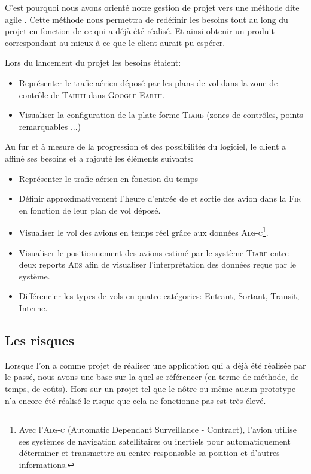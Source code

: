 C'est pourquoi nous avons orienté notre gestion de projet vers une méthode dite agile . Cette méthode nous permettra de redéfinir les besoins tout au long du projet en fonction de ce qui a déjà été réalisé. Et ainsi obtenir un produit correspondant au mieux à ce que le client aurait pu espérer.

Lors du lancement du projet les besoins étaient:
\begin{itemize}
    \item Représenter le trafic aérien déposé par les plans de vol dans la zone de contrôle de \textsc{Tahiti} dans \textsc{Google Earth}.
    \item Visualiser la configuration de la plate-forme \textsc{Tiare} (zones de contrôles, points remarquables ...)
\end{itemize}\medskip

Au fur et à mesure de la progression et des possibilités du logiciel, le client a affiné ses besoins et a rajouté les éléments suivants:
\begin{itemize}
    \item Représenter le trafic aérien en fonction du temps
    \item Définir approximativement l'heure d'entrée de et sortie des avion dans la \textsc{Fir}  en fonction de leur plan de vol déposé.
    \item Visualiser le vol des avions en temps réel grâce aux données \textsc{Ads-c}\footnote{Avec l'\textsc{Ads-c} (Automatic Dependant Surveillance - Contract), l'avion utilise ses systèmes de navigation satellitaires ou inertiels pour automatiquement déterminer et transmettre au centre responsable sa position et d'autres informations.}.
    \item Visualiser le positionnement des avions estimé par le système \textsc{Tiare} entre deux reports \textsc{Ads} afin de visualiser l'interprétation des données reçue par le système.
    \item Différencier les types de vols en quatre catégories: Entrant, Sortant, Transit, Interne. 
\end{itemize}\medskip

    \subsection{Les risques}
Lorsque l'on a comme projet de réaliser une application qui a déjà été réalisée par le passé, nous avons une base sur la-quel se référencer (en terme de méthode, de temps, de coûts). Hors sur un projet tel que le nôtre ou même aucun prototype n'a encore été réalisé le risque que cela ne fonctionne pas est très élevé.


